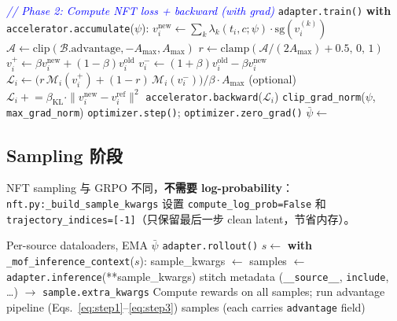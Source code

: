 \documentclass[11pt,a4paper]{article}
\newcommand{\loss}{\mathcal{L}}
\newcommand{\adv}{\mathcal{A}}
\newcommand{\sg}{\mathrm{sg}}
\theoremstyle{definition}
\begin{document}
\begin{algorithm}[H]
\begin{algorithmic}[1]
    \Statex \quad\textcolor{blue}{\textit{// Phase 2: Compute NFT loss + backward (with grad)}}
    \State \texttt{adapter.train()}
      \State \textbf{with} \texttt{accelerator.accumulate}($\psi$):
      \State \quad $v^{\text{new}}_i \gets \sum_k \lambda_k(t_i, c; \psi) \cdot \sg(v^{(k)}_i)$
      \State \quad $\adv \gets \mathrm{clip}(\mathcal{B}.\text{advantage}, -A_{\max}, A_{\max})$
      \State \quad $r \gets \mathrm{clamp}(\adv / (2 A_{\max}) + 0.5,\,0,\,1)$
      \State \quad $v^{+}_i \gets \beta v^{\text{new}}_i + (1-\beta) v^{\text{old}}_i$
      \State \quad $v^{-}_i \gets (1+\beta) v^{\text{old}}_i - \beta v^{\text{new}}_i$
      \State \quad $\loss_i \gets \big(r\,\mathcal{M}_i(v^{+}_i) + (1-r)\,\mathcal{M}_i(v^{-}_i)\big) / \beta \cdot A_{\max}$
      \State \quad (optional) $\loss_i \mathrel{+}= \beta_{\text{KL}} \cdot \|v^{\text{new}}_i - v^{\text{ref}}_i\|^2$
      \State \quad \texttt{accelerator.backward}($\loss_i$)
        \State \texttt{clip\_grad\_norm}($\psi$, \texttt{max\_grad\_norm})
        \State \texttt{optimizer.step()}; \texttt{optimizer.zero\_grad()}
      \EndIf
    \EndFor
  \EndFor
\EndFor
\State $\bar\psi \gets$  
\end{algorithmic}
\end{algorithm}

\subsection{Sampling 阶段}

NFT sampling 与 GRPO 不同，\textbf{不需要 log-probability}：
\texttt{nft.py:\_build\_sample\_kwargs} 设置 \texttt{compute\_log\_prob=False}
和 \texttt{trajectory\_indices=[-1]}（只保留最后一步 clean latent，节省内存）。

\begin{algorithm}[H]
\caption{MoF Sampling Phase (\texttt{common.py:sample})}
\label{alg:sample}
\begin{algorithmic}[1]
\Require Per-source dataloaders, EMA $\bar\psi$
\Statex
\State \texttt{adapter.rollout()}
 
  \State $s \gets$ 
  \State \textbf{with} \texttt{\_mof\_inference\_context}($s$):
  \State \quad sample\_kwargs $\gets$ 
  \State \quad samples $\gets$ \texttt{adapter.inference}(**sample\_kwargs)
  \State stitch metadata (\texttt{\_\_source\_\_}, \texttt{include}, \ldots)
        $\to$ \texttt{sample.extra\_kwargs}
\EndFor
\State Compute rewards on all samples; run advantage pipeline (Eqs.~\eqref{eq:step1}--\eqref{eq:step3})
\State \Return samples (each carries \texttt{advantage} field)
\end{algorithmic}
\end{algorithm}
\end{document}
